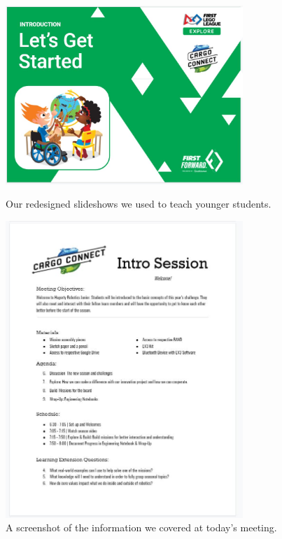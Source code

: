 \begin{figure}[ht]
\centering
\begin{minipage}[b]{.50\textwidth}
  \centering
  \includegraphics[width=0.8\textwidth]{Meetings/September/09-09-21/9-9-21_Outreach_Image1 - Nathan Forrer.JPG}
  \caption{Our redesigned slideshows we used to teach younger students.}
  \label{fig:pic1}
\end{minipage}%
\hfill%
\begin{minipage}[b]{.50\textwidth}
  \centering
  \includegraphics[width=0.8\textwidth]{Meetings/September/09-09-21/9-9-21_Outreach_Image2 - Nathan Forrer.JPG}
  \caption{A screenshot of the information we covered at today's meeting.}
  \label{fig:pic2}
\end{minipage}
\end{figure}

